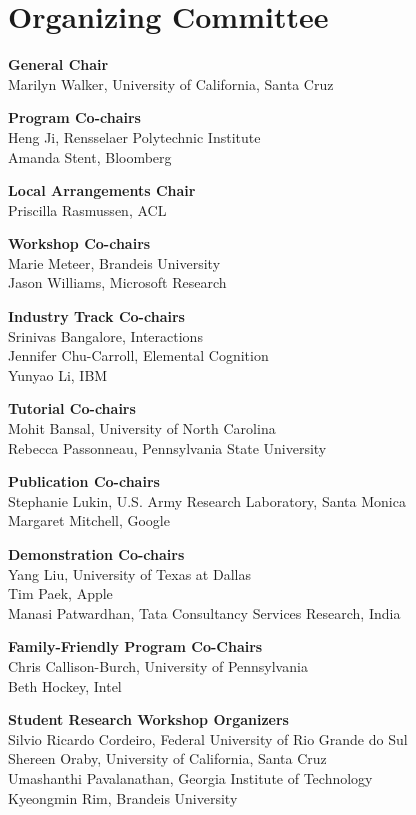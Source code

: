 \markboth{}{} %
\markright{}{} %

\section{Organizing Committee}{}\vspace{2em}

\setlength{\parindent}{0pt}

{\bf General Chair} \\
Marilyn Walker, University of California, Santa Cruz

{\bf Program Co-chairs} \\
Heng Ji, Rensselaer Polytechnic Institute\\
Amanda Stent, Bloomberg

{\bf Local Arrangements Chair} \\
Priscilla Rasmussen, ACL

{\bf Workshop Co-chairs} \\
Marie Meteer, Brandeis University\\
Jason Williams, Microsoft Research

{\bf Industry Track Co-chairs} \\
Srinivas Bangalore, Interactions \\
Jennifer Chu-Carroll, Elemental Cognition \\
Yunyao Li, IBM

{\bf Tutorial Co-chairs} \\
Mohit Bansal, University of North Carolina\\
Rebecca Passonneau, Pennsylvania State University

{\bf Publication Co-chairs} \\
Stephanie Lukin, U.S. Army Research Laboratory, Santa Monica\\
Margaret Mitchell, Google

{\bf Demonstration Co-chairs} \\
Yang Liu, University of Texas at Dallas\\
Tim Paek, Apple\\
Manasi Patwardhan, Tata Consultancy Services Research, India

{\bf Family-Friendly Program Co-Chairs} \\
Chris Callison-Burch, University of Pennsylvania\\
Beth Hockey, Intel

{\bf Student Research Workshop Organizers} \\
Silvio Ricardo Cordeiro, Federal University of Rio Grande do Sul \\
Shereen Oraby, University of California, Santa Cruz \\
Umashanthi Pavalanathan, Georgia Institute of Technology\\
Kyeongmin Rim, Brandeis University

